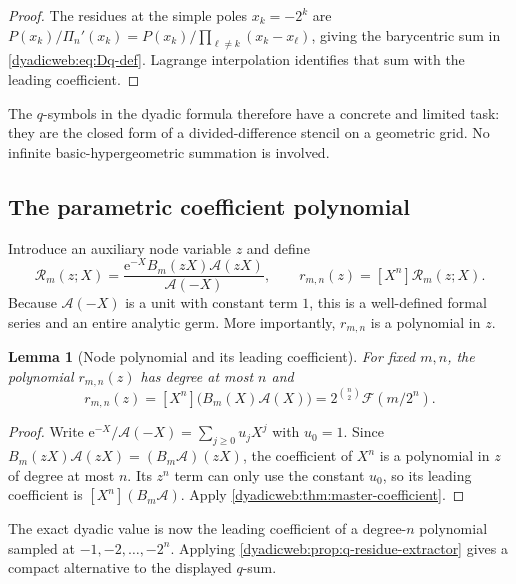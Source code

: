 \documentclass[11pt,oneside]{article}
\newtheorem{lemma}[theorem]{Lemma}
\theoremstyle{definition}
\theoremstyle{remark}
\newcommand{\e}{\mathrm e}
\begin{document}
\begin{proof}
The residues at the simple poles $x_k=-2^k$ are
$P(x_k)/\Pi_n'(x_k)=P(x_k)/\prod_{\ell\ne k}(x_k-x_\ell)$, giving the barycentric sum in
\eqref{dyadicweb:eq:Dq-def}.  Lagrange interpolation identifies that sum with the leading coefficient.
\end{proof}

The $q$-symbols in the dyadic formula therefore have a concrete and limited task: they are the
closed form of a divided-difference stencil on a geometric grid.  No infinite
basic-hypergeometric summation is involved.

\subsection{The parametric coefficient polynomial}

Introduce an auxiliary node variable $z$ and define
\begin{equation}
 \mathscr R_m(z;X)
 =\frac{\e^{-X}B_m(zX)\mathscr A(zX)}{\mathscr A(-X)},
 \qquad
 r_{m,n}(z)=[X^n]\mathscr R_m(z;X).                        \label{dyadicweb:eq:Rmn-def}
\end{equation}
Because $\mathscr A(-X)$ is a unit with constant term $1$, this is a well-defined formal
series and an entire analytic germ.  More importantly, $r_{m,n}$ is a polynomial in $z$.

\begin{lemma}[Node polynomial and its leading coefficient]
\label{dyadicweb:lem:Rmn-leading}
For fixed $m,n$, the polynomial $r_{m,n}(z)$ has degree at most $n$ and
\begin{equation}
 [z^n]r_{m,n}(z)=[X^n]\bigl(B_m(X)\mathscr A(X)\bigr)
 =2^{\binom n2}\mathcal F(m/2^n).                         \label{dyadicweb:eq:Rmn-leading}
\end{equation}
\end{lemma}

\begin{proof}
Write
\(
 \e^{-X}/\mathscr A(-X)=\sum_{j\ge0}u_jX^j
\)
with $u_0=1$.  Since
$B_m(zX)\mathscr A(zX)=(B_m\mathscr A)(zX)$, the coefficient of $X^n$ is a polynomial in $z$
of degree at most $n$.  Its $z^n$ term can only use the constant $u_0$, so its leading
coefficient is $[X^n](B_m\mathscr A)$.  Apply \cref{dyadicweb:thm:master-coefficient}.
\end{proof}

The exact dyadic value is now the leading coefficient of a degree-$n$ polynomial sampled at
$-1,-2,\ldots,-2^n$.  Applying \cref{dyadicweb:prop:q-residue-extractor} gives a compact alternative
to the displayed $q$-sum.
\end{document}

